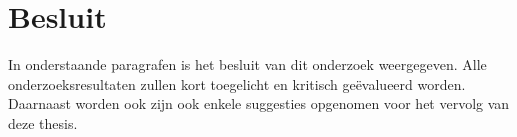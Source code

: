 \chapter{Besluit}
\label{besluit}

\par In onderstaande paragrafen is het besluit van dit onderzoek weergegeven. Alle onderzoeksresultaten zullen kort toegelicht en kritisch ge\"evalueerd worden. Daarnaast worden ook zijn ook enkele suggesties opgenomen voor het vervolg van deze thesis.

